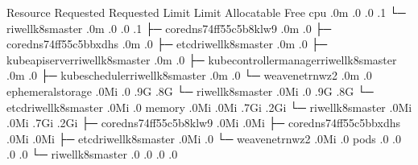 \documentclass[letterpaper,10pt,english]{sphinxmanual}
\begin{document}
\begin{sphinxVerbatim}[commandchars=\\\{\}]
 Resource                                          Requested  \PYGZpc{}Requested    Limit  \PYGZpc{}Limit  Allocatable   Free
  cpu                                                 .0m         \PYGZpc{}      .0      \PYGZpc{}          .0    .1
  └─ riwell\PYGZhy{}k8s\PYGZhy{}master                                .0m         \PYGZpc{}      .0      \PYGZpc{}          .0    .1
     ├─ coredns\PYGZhy{}74ff55c5b\PYGZhy{}8klw9                       .0m                  .0
     ├─ coredns\PYGZhy{}74ff55c5b\PYGZhy{}bxdhs                       .0m                  .0
     ├─ etcd\PYGZhy{}riwell\PYGZhy{}k8s\PYGZhy{}master                        .0m                  .0
     ├─ kube\PYGZhy{}apiserver\PYGZhy{}riwell\PYGZhy{}k8s\PYGZhy{}master              .0m                  .0
     ├─ kube\PYGZhy{}controller\PYGZhy{}manager\PYGZhy{}riwell\PYGZhy{}k8s\PYGZhy{}master     .0m                  .0
     ├─ kube\PYGZhy{}scheduler\PYGZhy{}riwell\PYGZhy{}k8s\PYGZhy{}master              .0m                  .0
     └─ weave\PYGZhy{}net\PYGZhy{}rnwz2                               .0m                  .0
  ephemeral\PYGZhy{}storage                                  .0Mi          \PYGZpc{}      .0      \PYGZpc{}        .9G  .8G
  └─ riwell\PYGZhy{}k8s\PYGZhy{}master                               .0Mi          \PYGZpc{}      .0      \PYGZpc{}        .9G  .8G
     └─ etcd\PYGZhy{}riwell\PYGZhy{}k8s\PYGZhy{}master                       .0Mi                  .0
  memory                                             .0Mi          \PYGZpc{}  .0Mi      \PYGZpc{}        .7Gi  .2Gi
  └─ riwell\PYGZhy{}k8s\PYGZhy{}master                               .0Mi          \PYGZpc{}  .0Mi      \PYGZpc{}        .7Gi  .2Gi
     ├─ coredns\PYGZhy{}74ff55c5b\PYGZhy{}8klw9                       .0Mi              .0Mi
     ├─ coredns\PYGZhy{}74ff55c5b\PYGZhy{}bxdhs                       .0Mi              .0Mi
     ├─ etcd\PYGZhy{}riwell\PYGZhy{}k8s\PYGZhy{}master                       .0Mi                  .0
     └─ weave\PYGZhy{}net\PYGZhy{}rnwz2                              .0Mi                  .0
  pods                                                   .0          \PYGZpc{}      .0      \PYGZpc{}        .0  .0
  └─ riwell\PYGZhy{}k8s\PYGZhy{}master                                   .0          \PYGZpc{}      .0      \PYGZpc{}        .0  .0


\end{sphinxVerbatim}
\end{document}
